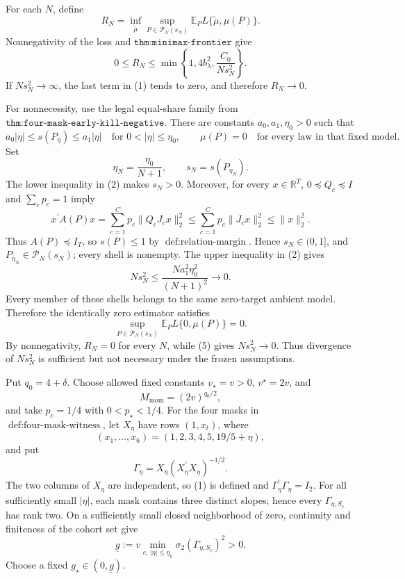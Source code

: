 For each \(N\), define
\[
R_N=\inf_{\widetilde\mu}\sup_{P\in\mathcal P_N(s_N)}
\mathbb E_PL\{\widetilde\mu,\mu(P)\}.
\]
Nonnegativity of the loss and \(\texttt{thm:minimax-frontier}\) give
\[
0\leq R_N\leq\min\!\left\{1,4b_\lambda^2,\frac{C_0}{Ns_N^2}\right\}.
\tag{1}
\]
If \(Ns_N^2\to\infty\), the last term in (1) tends to zero, and therefore \(R_N\to0\).

For nonnecessity, use the legal equal-share family from \(\texttt{thm:four-mask-early-kill-negative}\). There are constants \(a_0,a_1,\eta_0>0\) such that
\[
a_0|\eta|\leq s(P_\eta)\leq a_1|\eta|
\quad\text{for }0<|\eta|\leq\eta_0,
\qquad
\mu(P)=0\quad\text{for every law in that fixed model}.
\tag{2}
\]
Set
\[
\eta_N=\frac{\eta_0}{N+1},
\qquad
s_N=s(P_{\eta_N}).
\tag{3}
\]
The lower inequality in (2) makes \(s_N>0\). Moreover, for every \(x\in\mathbb R^T\), \(0\preceq Q_c\preceq I\) and \(\sum_cp_c=1\) imply
\[
x^{\prime}A(P)x
=\sum_{c=1}^Cp_c\|Q_cJ_cx\|_2^2
\leq\sum_{c=1}^Cp_c\|J_cx\|_2^2
\leq\|x\|_2^2.
\tag{4}
\]
Thus \(A(P)\preceq I_T\), so \(s(P)\leq1\) by \(\operatorname{def:relation\text{-}margin}\). Hence \(s_N\in(0,1]\), and \(P_{\eta_N}\in\mathcal P_N(s_N)\); every shell is nonempty. The upper inequality in (2) gives
\[
Ns_N^2\leq\frac{Na_1^2\eta_0^2}{(N+1)^2}\longrightarrow0.
\tag{5}
\]
Every member of these shells belongs to the same zero-target ambient model. Therefore the identically zero estimator satisfies
\[
\sup_{P\in\mathcal P_N(s_N)}
\mathbb E_PL\{0,\mu(P)\}=0.
\tag{6}
\]
By nonnegativity, \(R_N=0\) for every \(N\), while (5) gives \(Ns_N^2\to0\). Thus divergence of \(Ns_N^2\) is sufficient but not necessary under the frozen assumptions.

Put \(q_0=4+\delta\). Choose allowed fixed constants \(v_\star=v>0\), \(v^{\star}=2v\), and
\[
M_{\mathrm{mom}}=(2v)^{q_0/2},
\]
and take \(p_c=1/4\) with \(0<p_\star<1/4\). For the four masks in \(\operatorname{def:four\text{-}mask\text{-}witness}\), let \(X_\eta\) have rows \((1,x_t)\), where
\[
(x_1,\ldots,x_6)=(1,2,3,4,5,19/5+\eta),
\]
and put
\[
\Gamma_\eta=X_\eta(X_\eta^{\prime}X_\eta)^{-1/2}.
\tag{1}
\]
The two columns of \(X_\eta\) are independent, so (1) is defined and \(\Gamma_\eta^{\prime}\Gamma_\eta=I_2\). For all sufficiently small \(|\eta|\), each mask contains three distinct slopes; hence every \(\Gamma_{\eta,S_c}\) has rank two. On a sufficiently small closed neighborhood of zero, continuity and finiteness of the cohort set give
\[
\underline g:=v\min_{c,\,|\eta|\leq\eta_0}
\sigma_2(\Gamma_{\eta,S_c})^2>0.
\]
Choose a fixed \(g_\star\in(0,\underline g)\).

